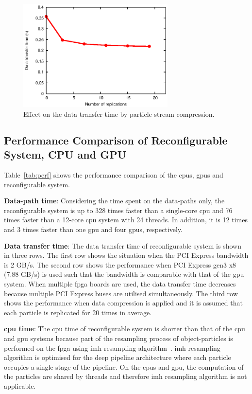 \begin{figure}[t!]
\centering
\includegraphics[width=0.7\textwidth]{4_adaptation/figures/fig_compression}
\caption{Effect on the data transfer time by particle stream compression.}
\label{fig:compression}
\end{figure}

\subsection{Performance Comparison of Reconfigurable System, CPU and GPU}
Table~\ref{tab:perf} shows the performance comparison of the \glspl{cpu}, \gls{gpu}s and reconfigurable system.

\textbf{Data-path time}: Considering the time spent on the data-paths only, the reconfigurable system is up to 328 times faster than a single-core \gls{cpu} and 76 times faster than a 12-core \gls{cpu} system with 24 threads.
In addition, it is 12 times and 3 times faster than one \gls{gpu} and four \gls{gpu}s, respectively.

\textbf{Data transfer time}: The data transfer time of reconfigurable system is shown in three rows.
The first row shows the situation when the PCI Express bandwidth is 2 GB/s.
The second row shows the performance when PCI Express gen3 x8 (7.88 GB/s) is used such that the bandwidth is comparable with that of the \gls{gpu} system.
When multiple \gls{fpga} boards are used, the data transfer time decreases because multiple PCI Express buses are utilised simultaneously.
The third row shows the performance when data compression is applied and it is assumed that each particle is replicated for 20 times in average.

\textbf{\gls{cpu} time}: The \gls{cpu} time of reconfigurable system is shorter than that of the \gls{cpu} and \gls{gpu} systems because part of the resampling process of object-particles is performed on the \gls{fpga} using \gls{imh} resampling algorithm~\cite{miao11}.
\gls{imh} resampling algorithm is optimised for the deep pipeline architecture where each particle occupies a single stage of the pipeline.
On the \glspl{cpu} and \gls{gpu}, the computation of the particles are shared by threads and therefore \gls{imh} resampling algorithm is not applicable.

